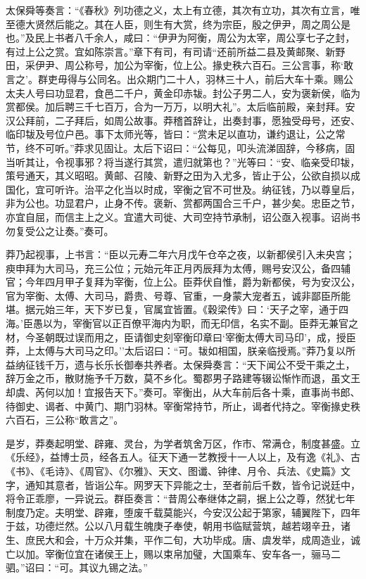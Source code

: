 \documentclass[]{article}
\begin{document}
太保舜等奏言：``《春秋》列功德之义，太上有立德，其次有立功，其次有立言，唯至德大贤然后能之。其在人臣，则生有大赏，终为宗臣，殷之伊尹，周之周公是也。''及民上书者八千余人，咸曰：``伊尹为阿衡，周公为太宰，周公享七子之封，有过上公之赏。宜如陈崇言。''章下有司，有司请``还前所益二县及黄邮聚、新野田，采伊尹、周公称号，加公为宰衡，位上公。掾史秩六百石。三公言事，称`敢言之'。群吏毋得与公同名。出众期门二十人，羽林三十人，前后大车十乘。赐公太夫人号曰功显君，食邑二千户，黄金印赤韨。封公子男二人，安为褒新侯，临为赏都侯。加后聘三千七百万，合为一万万，以明大礼''。太后临前殿，亲封拜。安汉公拜前，二子拜后，如周公故事。莽稽首辞让，出奏封事，愿独受母号，还安、临印韨及号位户邑。事下太师光等，皆曰：``赏未足以直功，谦约退让，公之常节，终不可听。''莽求见固让。太后下诏曰：``公每见，叩头流涕固辞，今移病，固当听其让，令视事邪？将当遂行其赏，遣归就第也？''光等曰：``安、临亲受印韨，策号通天，其义昭昭。黄邮、召陵、新野之田为入尤多，皆止于公，公欲自损以成国化，宜可听许。治平之化当以时成，宰衡之官不可世及。纳征钱，乃以尊皇后，非为公也。功显君户，止身不传。褒新、赏都两国合三千户，甚少矣。忠臣之节，亦宜自屈，而信主上之义。宜遣大司徙、大司空持节承制，诏公亟入视事。诏尚书勿复受公之让奏。''奏可。

莽乃起视事，上书言：``臣以元寿二年六月戊午仓卒之夜，以新都侯引入未央宫；瘐申拜为大司马，充三公位；元始元年正月丙辰拜为太傅，赐号安汉公，备四辅官；今年四月甲子复拜为宰衡，位上公。臣莽伏自惟，爵为新都侯，号为安汉公，官为宰衡、太傅、大司马，爵贵、号尊、官重，一身蒙大宠者五，诚非鄙臣所能堪。据元始三年，天下岁已复，官属宜皆置。《穀梁传》曰：`天子之宰，通于四海。'臣愚以为，宰衡官以正百僚平海内为职，而无印信，名实不副。臣莽无兼官之材，今圣朝既过误而用之，臣请御史刻宰衡印章曰`宰衡太傅大司马印'，成，授臣莽，上太傅与大司马之印。''太后诏曰：``可。韨如相国，朕亲临授焉。''莽乃复以所益纳征钱千万，遗与长乐长御奉共养者。太保舜奏言：``天下闻公不受干乘之土，辞万金之币，散财施予千万数，莫不乡化。蜀郡男子路建等辍讼惭怍而退，虽文王却虞、芮何以加！宜报告天下。''奏可。宰衡出，从大车前后各十乘，直事尚书郎、待御史、谒者、中黄门、期门羽林。宰衡常持节，所止，谒者代持之。宰衡掾史秩六百石，三公称``敢言之''。

是岁，莽奏起明堂、辟雍、灵台，为学者筑舍万区，作市、常满仓，制度甚盛。立《乐经》，益博士员，经各五人。征天下通一艺教授十一人以上，及有逸《礼》、古《书》、《毛诗》、《周官》、《尔雅》、天文、图谶、钟律、月令、兵法、《史篇》文字，通知其意者，皆诣公车。网罗天下异能之士，至者前后千数，皆令记说廷中，将令正乖廖，一异说云。群臣奏言：``昔周公奉继体之嗣，据上公之尊，然犹七年制度乃定。夫明堂、辟雍，堕废千载莫能兴，今安汉公起于第家，辅翼陛下，四年于兹，功德烂然。公以八月载生魄庚子奉使，朝用书临赋营筑，越若翊辛丑，诸生、庶民大和会，十万众并集，平作二旬，大功毕成。唐、虞发举，成周造业，诚亡以加。宰衡位宜在诸侯王上，赐以束帛加璧，大国乘车、安车各一，骊马二驷。''诏曰：``可。其议九锡之法。''
\end{document}
